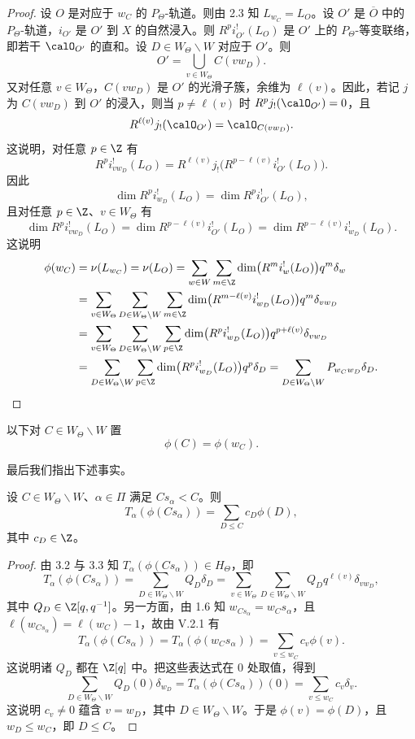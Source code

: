 \begin{proof}
设 $O$ 是对应于 $w_C$ 的 $P_\Theta$-轨道。则由 2.3 知 $L_{w_C}=L_O$。设 $O'$ 是 $\overline O$ 中的 $P_\Theta$-轨道，$i_{O'}$ 是 $O'$ 到 $X$ 的自然浸入。则 $R^pi_{O'}^!(L_O)$ 是 $O'$ 上的 $P_\Theta$-等变联络，即若干 $\calO_{O'}$ 的直和。设 $D\in W_\Theta\backslash W$ 对应于 $O'$。则
$$O'=\bigcup_{v\in W_\Theta}C(vw_D).$$
又对任意 $v\in W_\Theta$，$C(vw_D)$ 是 $O'$ 的光滑子簇，余维为 $\ell(v)$。因此，若记 $j$ 为 $C(vw_D)$ 到 $O'$ 的浸入，则当 $p\neq\ell(v)$ 时 $R^pj_!(\calO_{O'})=0$，且
$$R^{\ell(v)}j_!(\calO_{O'})=\calO_{C(vw_D)}.$$
这说明，对任意 $p\in\Z$ 有
$$R^pi_{vw_D}^!(L_O)=R^{\ell(v)}j_!\bigl(R^{p-\ell(v)}i_{O'}^!(L_O)\bigr).$$
因此
$$\dim R^pi_{w_D}^!(L_O)=\dim R^pi_{O'}^!(L_O),$$
且对任意 $p\in\Z$、$v\in W_\Theta$ 有
$$\dim R^pi_{vw_D}^!(L_O)=\dim R^{p-\ell(v)}i_{O'}^!(L_O)=\dim R^{p-\ell(v)}i_{w_D}^!(L_O).$$
这说明
{\small
\begin{align*}
\phi(w_C)&=\nu(L_{w_C})=\nu(L_O)=\sum_{w\in W}\sum_{m\in\Z}\dim\bigl(R^mi_w^!(L_O)\bigr)q^m\delta_w\\
&=\sum_{v\in W_\Theta}\sum_{D\in W_\Theta\backslash W}\sum_{m\in\Z}\dim\bigl(R^{m-\ell(v)}i_{w_D}^!(L_O)\bigr)q^m\delta_{vw_D}\\
&=\sum_{v\in W_\Theta}\sum_{D\in W_\Theta\backslash W}\sum_{p\in\Z}\dim\bigl(R^pi_{w_D}^!(L_O)\bigr)q^{p+\ell(v)}\delta_{vw_D}\\
&=\sum_{D\in W_\Theta\backslash W}\sum_{p\in\Z}\dim\bigl(R^pi_{w_D}^!(L_O)\bigr)q^p\delta_D
=\sum_{D\in W_\Theta\backslash W}P_{w_Cw_D}\delta_D.
\end{align*}
}
\end{proof}

以下对 $C\in W_\Theta\backslash W$ 置
$$\phi(C)=\phi(w_C).$$

最后我们指出下述事实。

\begin{lemma}\label{lem:06.3.4}
设 $C\in W_\Theta\backslash W$、$\alpha\in\Pi$ 满足 $Cs_\alpha<C$。则
$$T_\alpha(\phi(Cs_\alpha))=\sum_{D\le C}c_D\phi(D),$$
其中 $c_D\in\Z$。
\end{lemma}

\begin{proof}
由 3.2 与 3.3 知 $T_\alpha(\phi(Cs_\alpha))\in H_\Theta$，即
{\small
$$T_\alpha(\phi(Cs_\alpha))=\sum_{D\in W_\Theta\backslash W}Q_D\delta_D
=\sum_{v\in W_\Theta}\sum_{D\in W_\Theta\backslash W}Q_Dq^{\ell(v)}\delta_{vw_D},$$}
其中 $Q_D\in\Z[q,q^{-1}]$。另一方面，由 1.6 知 $w_{Cs_\alpha}=w_Cs_\alpha$，且 $\ell(w_{Cs_\alpha})=\ell(w_C)-1$，故由 V.2.1 有
$$T_\alpha(\phi(Cs_\alpha))=T_\alpha(\phi(w_Cs_\alpha))=\sum_{v\le w_C}c_v\phi(v).$$
这说明诸 $Q_D$ 都在 $\Z[q]$ 中。把这些表达式在 $0$ 处取值，得到
$$\sum_{D\in W_\Theta\backslash W}Q_D(0)\delta_{w_D}=T_\alpha(\phi(Cs_\alpha))(0)=\sum_{v\le w_C}c_v\delta_v.$$
这说明 $c_v\neq0$ 蕴含 $v=w_D$，其中 $D\in W_\Theta\backslash W$。于是 $\phi(v)=\phi(D)$，且 $w_D\le w_C$，即 $D\le C$。
\end{proof}

